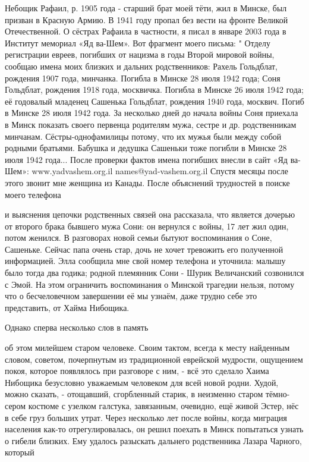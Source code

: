 \label{059-1}
Небощик Рафаил, р. 1905 года - старший брат моей тёти, жил в Минске, был призван в Красную Армию. В 1941 году пропал без вести на фронте Великой Отечественной. О сёстрах Рафаила в частности, я писал в январе 2003 года в Институт мемориал «Яд ва-Шем». Вот фрагмент моего письма: "
Отделу регистрации евреев, погибших от нацизма в годы Второй мировой войны, сообщаю имена моих близких и дальних родственников: Рахель Гольдблат, рождения 1907 года, минчанка. Погибла в Минске 28 июля 1942 года; Соня Гольдблат, рождения 1918 года, москвичка. Погибла в Минске 26 июля 1942 года; её годовалый младенец Сашенька Гольдблат, рождения 1940 года, москвич. Погиб в Минске 28 июля 1942 года. За несколько дней до начала войны Соня приехала в Минск показать своего первенца родителям мужа, сестре и др. родственникам минчанам. Сёстры-однофамилицы потому, что их мужья были между собой родными братьями. Бабушка и дедушка Сашеньки тоже погибли в Минске 28 июля 1942 года... После проверки фактов имена погибших внесли в сайт «Яд ва-Шем»: 
www.yadvashem.org.il names@yad-vashem.org.il 
Спустя месяцы после этого звонит мне женщина из Канады. После объяснений трудностей в поиске моего телефона

\label{060-1}
и выяснения цепочки родственных связей она рассказала, что является дочерью от второго брака бывшего мужа Сони: он вернулся с войны, 17 лет жил один, потом женился. В разговорах новой семьи бытуют воспоминания о Соне, Сашеньке. Сейчас папа очень стар, дочь не хочет тревожить его полученной информацией. Элла сообщила мне свой номер телефона и уточнила: малышу было тогда два годика; родной племянник Сони - Шурик Величанский созвонился с Эмой. На этом ограничить воспоминания о Минской трагедии нельзя, потому что о бесчеловечном завершении её мы узнаём, даже трудно себе это представить, от Хайма Нибощика.

\label{061-1}
Однако сперва несколько слов в память

\label{062-1}
об этом милейшем старом человеке. Своим тактом, всегда к месту найденным словом, советом, почерпнутым из традиционной еврейской мудрости, ощущением покоя, которое появлялось при разговоре с ним, - всё это сделало Хаима Нибощика безусловно уважаемым человеком для всей новой родни. Худой, можно сказать, - отощавший, сгорбленный старик, в неизменно старом тёмно-сером костюме с узелком галстука, завязанным, очевидно, ещё живой Эстер, нёс в себе груз больших утрат. Через несколько лет после войны, когда миграция населения как-то отрегулировалась, он решил поехать в Минск попытаться узнать о гибели близких. Ему удалось разыскать дальнего родственника Лазара Чарного, который

